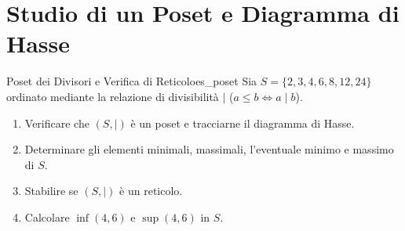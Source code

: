 \section{Studio di un Poset e Diagramma di Hasse}

\begin{esercizio}{Poset dei Divisori e Verifica di Reticolo}{es_poset}
Sia $S = \{2, 3, 4, 6, 8, 12, 24\}$ ordinato mediante la relazione di divisibilità $\mid$ ($a \le b \iff a \mid b$).
\begin{enumerate}
    \item Verificare che $(S, \mid)$ è un poset e tracciarne il diagramma di Hasse.
    \item Determinare gli elementi minimali, massimali, l'eventuale minimo e massimo di $S$.
    \item Stabilire se $(S, \mid)$ è un reticolo.
    \item Calcolare $\inf(4, 6)$ e $\sup(4, 6)$ in $S$.
\end{enumerate}
\end{esercizio}

